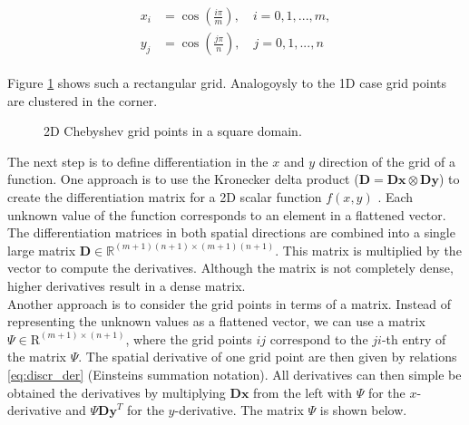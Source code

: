\begin{align} \label{eq:cheb_nodes2d}
  \begin{split}
  x_i & = \cos(\frac{i \pi}{m}), \quad i = 0,1,...,m, \\ 
  y_j &  = \cos(\frac{j \pi}{n}), \quad j = 0,1,...,n
  \end{split}
\end{align}

Figure \ref{fig:cheb_grid2d} shows such a rectangular grid. Analogoysly to the
1D case grid points are clustered in the corner.

\begin{figure}[h]
  \centering


  \caption{2D Chebyshev grid points in a square domain.}
  \label{fig:cheb_grid2d}
\end{figure}

The next step is to define differentiation in the $x$ and $y$ direction of the
grid of a function. One approach is to use the Kronecker delta product
($\mathbf{D} = \mathbf{Dx} \otimes \mathbf{Dy}$) to create the differentiation
matrix for a 2D scalar function $f(x,y)$ \citep{trefethen2000}. Each unknown
value of the function corresponds to an element in a flattened vector. The
differentiation matrices in both spatial directions are combined into a single
large matrix $\mathbf{D} \in \mathbb{R}^{(m+1)(n+1)\times(m+1)(n+1)}$. This
matrix is multiplied by the vector to compute the derivatives. Although the
matrix is not completely dense, higher derivatives result in a dense matrix. \\

Another approach is to consider the grid points in terms of a matrix. Instead
of representing the unknown values as a flattened vector, we can use a matrix
$\Psi \in \mathrm{R}^{(m+1) \times (n+1)}$, where the grid points $ij$
correspond to the $ji$-th entry of the matrix $\Psi$. The spatial derivative of
one grid point are then given by relations \eqref{eq:discr_der} (Einsteins
summation notation). All derivatives can then simple be obtained the
derivatives by multiplying $\mathbf{Dx}$ from the left with $\Psi$ for the
$x$-derivative and $\Psi \mathbf{Dy}^T$ for the $y$-derivative. The matrix
$\Psi$ is shown below.

